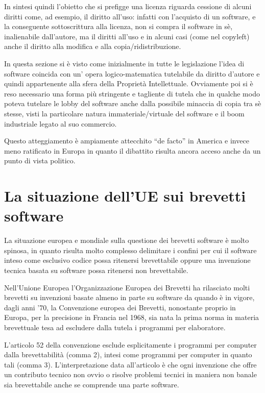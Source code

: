 In sintesi quindi l'obietto che si prefigge una licenza riguarda cessione di alcuni diritti come, ad esempio, il diritto all'uso: infatti con l'acquisto di un software, e la conseguente sottoscrittura alla licenza, non si compra il software in sè, inalienabile dall'autore, ma il diritti all'uso e in alcuni casi (come nel copyleft) anche il diritto alla modifica e alla copia/ridistribuzione.

In questa sezione si è visto come inizialmente in tutte le legislazione l'idea di software coincida con un' opera logico-matematica tutelabile da diritto d'autore e quindi appartenente alla sfera della Proprietà Intellettuale. Ovviamente poi si è reso necessario una forma più stringente e tagliente di tutela che in qualche modo poteva tutelare le lobby del software anche dalla possibile minaccia di copia tra sè stesse, visti la particolare natura immateriale/virtuale del software e il boom industriale legato al suo commercio.

Questo atteggiamento è ampiamente attecchito ``de facto'' in America e invece meno ratificato in Europa in quanto il dibattito risulta ancora acceso anche da un punto di vista politico.

\section{La situazione dell'UE sui brevetti software}
La situazione europea e mondiale sulla questione dei brevetti software è molto spinosa, in quanto risulta molto complesso delimitare i confini per cui il software inteso come esclusivo codice possa ritenersi brevettabile oppure una invenzione tecnica basata su software possa ritenersi non brevettabile.

Nell'Unione Europea l'Organizzazione Europea dei Brevetti ha rilasciato molti brevetti su invenzioni basate almeno in parte su software da quando è in vigore, dagli anni '70, la Convenzione europea dei Brevetti, nonostante proprio in Europa, per la precisione in Francia nel 1968\cite{invenzione-software}, sia nata la prima norma in materia brevettuale tesa ad escludere dalla tutela i programmi per elaboratore.

L'articolo 52  della convenzione esclude esplicitamente i programmi per computer dalla brevettabilità (comma 2), intesi come programmi per computer in quanto tali (comma 3). L'interpretazione data all'articolo è che ogni invenzione che offre un contributo tecnico non ovvio o risolve problemi tecnici in maniera non banale sia brevettabile anche se comprende una parte software.

